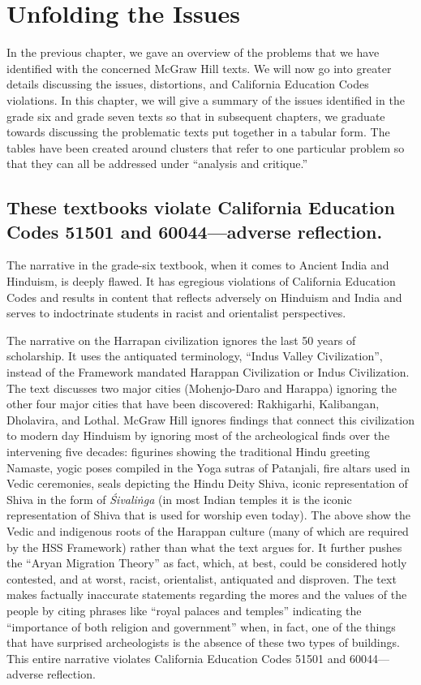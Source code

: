 \chapter{Unfolding the Issues}

In the previous chapter, we gave an overview of the problems that we have identified with the concerned McGraw Hill texts. We will now go into greater details discussing the issues, distortions, and California Education Codes violations. In this chapter, we will give a summary of the issues identified in the grade six and grade seven texts so that in subsequent chapters, we graduate towards discussing the problematic texts put together in a tabular form. The tables have been created around clusters that refer to one particular problem so that they can all be addressed under “analysis and critique.”  
\vskip -10pt

\section*{These textbooks violate California Education Codes 51501 and 60044—adverse reflection.} 
\vskip -6pt

The narrative in the grade-six textbook, when it comes to Ancient India and Hinduism, is deeply flawed. It has egregious violations of California Education Codes and results in content that reflects adversely on Hinduism and India and serves to indoctrinate students in racist and orientalist perspectives.

The narrative on the Harrapan civilization ignores the last 50 years of scholarship. It uses the antiquated terminology, “Indus Valley Civilization”, instead of the Framework mandated Harappan Civilization or Indus Civilization. The text discusses two major cities (Mohenjo-Daro and Harappa) ignoring the other four major cities that have been discovered: Rakhigarhi, Kalibangan, Dholavira, and Lothal. McGraw Hill ignores findings that connect this civilization to modern day Hinduism by ignoring most of the archeological finds over the intervening five decades: figurines showing the traditional Hindu greeting Namaste, yogic poses compiled in the Yoga sutras of Patanjali, fire altars used in Vedic ceremonies, seals depicting the Hindu Deity Shiva, iconic representation of Shiva in the form of \textit{Śivaliṅga}  (in most Indian temples it is the iconic representation of Shiva that is used for worship even today). The above show the Vedic and indigenous roots of the Harappan culture (many of which are required by the HSS Framework) rather than what the text argues for. It further pushes the “Aryan Migration Theory” as fact, which, at best, could be considered hotly contested, and at worst, racist, orientalist, antiquated and disproven. The text makes factually inaccurate statements regarding the mores and the values of the people by citing phrases like “royal palaces and temples” indicating the “importance of both religion and government” when, in fact, one of the things that have surprised archeologists is the absence of these two types of buildings. This entire narrative violates California Education Codes 51501 and 60044—adverse reflection.  

